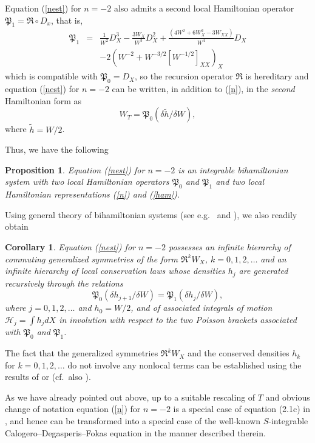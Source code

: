 \documentclass[12pt]{article}
\newtheorem{cor}{Corollary}
\newtheorem{pro}{Proposition}
\begin{document}
Equation (\ref{nest}) for $n=-2$ also admits a second local Hamiltonian operator $\mathfrak{P}_1=\mathfrak{R}\circ D_x$, that is,
\[
\begin{array}{rcl}
\mathfrak{P}_1&=&\displaystyle\frac{1}{W^2} D_X^3-\frac{3 W_X}{W^3}D_X^2+\frac{(4 W^2+6 W_X^2-3 W_{XX})}{W^4}D_X\\[5mm]
&&-2\left(W^{-2}+W^{-3/2} \left[W^{-1/2}  \right ]_{XX}  \right)_X
\end{array}
\]
which is compatible with $\mathfrak{P}_0=D_X$, so the recursion operator $\mathfrak{R}$ is hereditary and equation (\ref{nest}) for $n=-2$ can be written, in addition to (\ref{n}), in the {\em second} Hamiltonian form as
\begin{equation}\label{ham}
W_T=\mathfrak{P}_0(\delta\tilde h/\delta W),
\end{equation}
where $\tilde{h}=W/2$.

Thus, we have the following
\begin{pro}\label{biham}
Equation (\ref{nest}) for $n=-2$ is an integrable bihamiltonian system with two local Hamiltonian operators $\mathfrak{P}_0$ and $\mathfrak{P}_1$ and two local Hamiltonian representations (\ref{n}) and (\ref{ham}).
\end{pro}

Using general theory of bihamiltonian systems (see e.g.\ \cite[Ch. 7]{Olver} and \cite{olver-bih}), we also readily obtain
\begin{cor}\label{biham-c}
Equation (\ref{nest}) for $n=-2$ possesses an infinite hierarchy of commuting generalized symmetries of the form $\mathfrak{R}^k W_X$, $k=0,1,2,\dots$ and an infinite hierarchy of local conservation laws whose densities $h_j$ are generated recursively through the relations
\[
\mathfrak{P}_0(\delta h_{j+1}/\delta W)=\mathfrak{P}_1(\delta h_j/\delta W),
\]
where $j=0,1,2,\dots$ and $h_0=W/2$, and of associated integrals of motion $\mathcal{H}_j=\int h_j dX$ in involution with respect to the two Poisson brackets associated with $\mathfrak{P}_0$ and $\mathfrak{P}_1$.
\end{cor}

The fact that the generalized symmetries $\mathfrak{R}^k W_X$ and the conserved densities $h_k$ for $k=0,1,2,\dots$ do not involve any nonlocal terms can be established using the results of \cite{sw} or \cite{sro} (cf.\ also \cite{sc}).

As we have already pointed out above, up to a suitable rescaling of $T$ and obvious change of notation equation (\ref{n}) for $n=-2$ is a special case of equation (2.1c) in \cite{ms}, and hence can be transformed into a special case of the well-known $S$-integrable Calogero--Degasperis--Fokas \cite{cd, f} equation in the manner described therein. %
\end{document}

